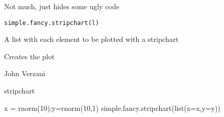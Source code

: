 \begin{Description}\relax
Not much, just hides some ugly code
\end{Description}
\begin{Usage}
\begin{verbatim}
simple.fancy.stripchart(l)
\end{verbatim}
\end{Usage}
\begin{Arguments}
\begin{ldescription}
\item[\code{l}] A list with each element to be plotted with a stripchart 
\end{ldescription}
\end{Arguments}
\begin{Value}
Creates the plot
\end{Value}
\begin{Author}\relax
John Verzani
\end{Author}
\begin{SeeAlso}\relax
stripchart
\end{SeeAlso}
\begin{Examples}
\begin{ExampleCode}
x = rnorm(10);y=rnorm(10,1)
simple.fancy.stripchart(list(x=x,y=y))
\end{ExampleCode}
\end{Examples}

